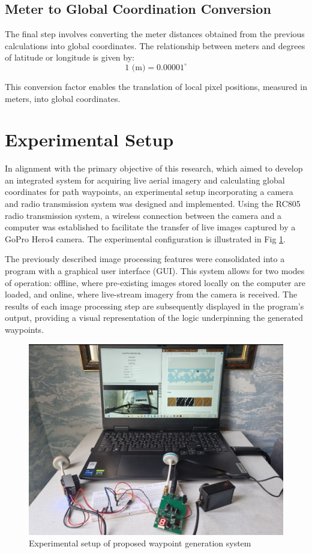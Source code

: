 \documentclass[conference]{IEEEtran}
\begin{document}
\subsection{Meter to Global Coordination Conversion}\label{Meter to Global Coordination Conversion}
The final step involves converting the meter distances obtained from the previous calculations into global coordinates. The relationship between meters and degrees of latitude or longitude is given by:
\[
1 \text{ (m)} = 0.00001^\circ
\]

This conversion factor enables the translation of local pixel positions, measured in meters, into global coordinates.

\section{Experimental Setup}\label{Experimental Setup}
In alignment with the primary objective of this research, which aimed to develop an integrated system for acquiring live aerial imagery and calculating global coordinates for path waypoints, an experimental setup incorporating a camera and radio transmission system was designed and implemented. Using the RC805 radio transmission system, a wireless connection between the camera and a computer was established to facilitate the transfer of live images captured by a GoPro Hero4 camera. The experimental configuration is illustrated in Fig
\ref{EXP}.

The previously described image processing features were consolidated into a program with a graphical user interface (GUI). This system allows for two modes of operation: offline, where pre-existing images stored locally on the computer are loaded, and online, where live-stream imagery from the camera is received. The results of each image processing step are subsequently displayed in the program's output, providing a visual representation of the logic underpinning the generated waypoints.

\begin{figure}[htbp]
\includegraphics[width=\linewidth]{Setup of experiment.png}
\caption{Experimental setup of proposed waypoint generation system}
\label{EXP}
\end{figure}
\end{document}
